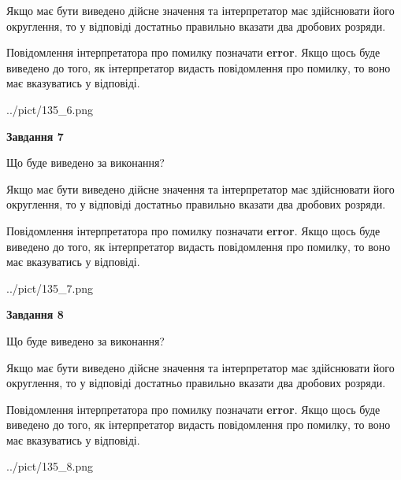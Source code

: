 \documentclass[12pt, ukrainian]{article}
\begin{document}
{\begin {Large}
Якщо має бути виведено дійсне значення та інтерпретатор має здійснювати його округлення, 
то у відповіді достатньо правильно вказати два дробових розряди.

Повідомлення інтерпретатора про помилку позначати \textbf{error}.
Якщо щось буде виведено до того, як інтерпретатор видасть повідомлення про помилку, 
то воно має вказуватись у відповіді. \par

\begin{center}
	{../pict/135_6.png}
\end{center}
\newpage

{\begin {center}\textbf{Завдання 7}\end {center}}\par
Що буде виведено за виконання? \par

Якщо має бути виведено дійсне значення та інтерпретатор має здійснювати його округлення, 
то у відповіді достатньо правильно вказати два дробових розряди.

Повідомлення інтерпретатора про помилку позначати \textbf{error}.
Якщо щось буде виведено до того, як інтерпретатор видасть повідомлення про помилку, 
то воно має вказуватись у відповіді. \par

\begin{center}
	{../pict/135_7.png}
\end{center}
\newpage

{\begin {center}\textbf{Завдання 8}\end {center}}\par
Що буде виведено за виконання? \par

Якщо має бути виведено дійсне значення та інтерпретатор має здійснювати його округлення, 
то у відповіді достатньо правильно вказати два дробових розряди.

Повідомлення інтерпретатора про помилку позначати \textbf{error}.
Якщо щось буде виведено до того, як інтерпретатор видасть повідомлення про помилку, 
то воно має вказуватись у відповіді. \par

\begin{center}
	{../pict/135_8.png}
\end{center}
\newpage


\end{Large}}
\end{document}
